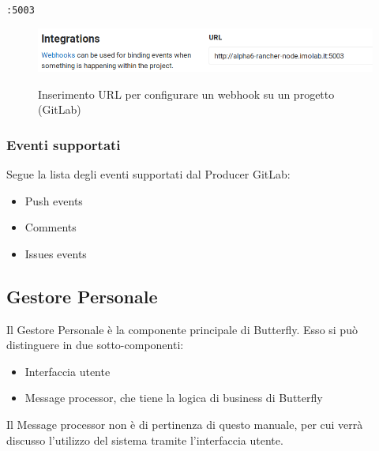 \begin{center}
    \texttt{\UriImola:5003}
\end{center}

\begin{figure}[H]
    \centering
    \includegraphics[width=\textwidth]{img/webhook-gitlab.png}\\
    \caption[Webhook, GitLab]{Inserimento URL per configurare un webhook su un progetto (GitLab)}
\end{figure}


\subsubsection{Eventi supportati}
Segue la lista degli eventi supportati dal Producer GitLab:
\begin{itemize}
    \item Push events
    \item Comments
    \item Issues events
\end{itemize}



\subsection{Gestore Personale}

Il Gestore Personale è la componente principale di Butterfly. %
Esso si può distinguere in due sotto-componenti:

\begin{itemize}
    \item Interfaccia utente
    \item Message processor, che tiene la logica di business di Butterfly
\end{itemize}

Il Message processor non è di pertinenza di questo manuale, per cui verrà discusso l'utilizzo del sistema tramite
l'interfaccia utente.


